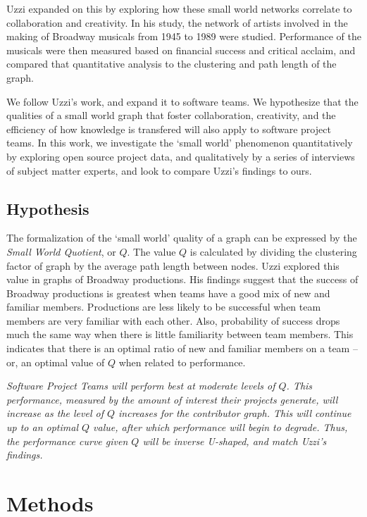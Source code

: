 \documentclass{proc}
\begin{document}
Uzzi \cite{uzzi2005collaboration} expanded on this by exploring how these small world networks correlate to collaboration and creativity. In his study, the network of artists involved in the making of Broadway musicals from 1945 to 1989 were studied. Performance of the musicals were then measured based on financial success and critical acclaim, and compared that quantitative analysis to the clustering and path length of the graph.

We follow Uzzi's work, and expand it to software teams. We hypothesize that the qualities of a small world graph that foster collaboration, creativity, and the efficiency of how knowledge is transfered\cite{latora2001efficient} will also apply to software project teams. In this work, we investigate the `small world' phenomenon quantitatively by exploring open source project data, and qualitatively by a series of interviews of subject matter experts, and look to compare Uzzi's findings to ours.

\subsection{Hypothesis}
The formalization of the `small world' quality of a graph can be expressed by the \textit{Small World Quotient}, or $Q$\cite{watts1999small,watts1998collective}. The value $Q$ is calculated by dividing the clustering factor of graph by the average path length between nodes. Uzzi explored this value in graphs of Broadway productions\cite{uzzi2005collaboration}. His findings suggest that the success of Broadway productions is greatest when teams have a good mix of new and familiar members. Productions are less likely to be successful when team members are very familiar with each other. Also, probability of success drops much the same way when there is little familiarity between team members. This indicates that there is an optimal ratio of new and familiar members on a team -- or, an optimal value of $Q$ when related to performance.

\textit{Software Project Teams will perform best at moderate levels of $Q$. This performance, measured by the amount of interest their projects generate, will increase as the level of $Q$ increases for the contributor graph. This will continue up to an optimal $Q$ value, after which performance will begin to degrade. Thus, the performance curve given $Q$ will be inverse U-shaped, and match Uzzi's findings\cite{uzzi2005collaboration}.}

\section{Methods}
\end{document}
